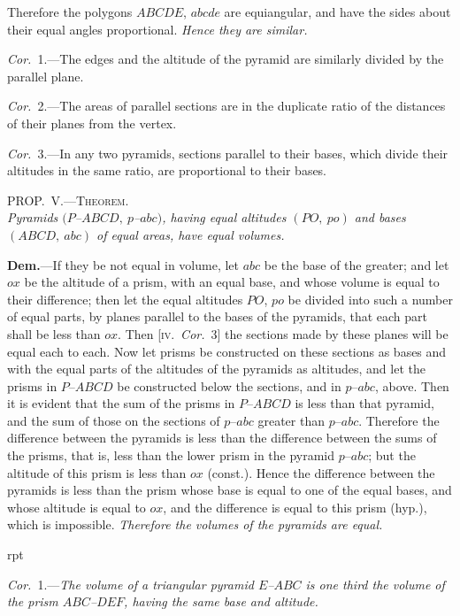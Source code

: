 \documentclass[oneside]{book}
\newcommand\myprop[2]{
\bigskip\Needspace*{4\baselineskip}\begin{center}\textsc{#1}\\\medskip\emph{#2}\par\end{center}
}
\newcommand\imgflow[3]{
\setcounter{wrapwidth}{#1}
\begin{wrapfigure}[#2]{r}{\value{wrapwidth}pt}
\begin{center}
\vspace{-0.3in}
\end{center}
\end{wrapfigure}
}
\newcommand\imgcent[2]{
\begin{center}
\end{center}
}
\begin{document}
Therefore the polygons $ABCDE$, $abcde$ are equiangular,
and have the sides about their equal angles proportional.
\emph{Hence they are similar.}

\emph{Cor.}~1.---The edges and the altitude of the pyramid
are similarly divided by the parallel plane.

\emph{Cor.}~2.---The areas of parallel sections are in the
duplicate ratio of the distances of their planes from the
vertex.

\emph{Cor.}~3.---In any two pyramids, sections parallel to
their bases, which divide their altitudes in the same
ratio, are proportional to their bases.


\myprop{PROP\@.~V.---Theorem.}{Pyramids $(P$--$ABCD,\ p$--$abc)$, having equal altitudes
$(PO,\ po)$ and bases $(ABCD,\ abc)$ of equal areas, have equal
volumes.}

\imgcent{298}{f242}

\textbf{Dem.}---If they be not equal in volume, let $abc$ be
the base of the greater; and let $ox$ be the altitude of a
prism, with an equal base, and whose volume is equal
to their difference; then let the equal altitudes $PO$, $po$
be divided into such a number of equal parts, by planes
parallel to the bases of the pyramids, that each part
shall be less than $ox$. Then [\textsc{iv.}\ \emph{Cor.}~3] the sections
made by these planes will be equal each to each. Now
let prisms be constructed on these sections as bases and
with the equal parts of the altitudes of the pyramids as
altitudes, and let the prisms in $P$--$ABCD$ be constructed
below the sections, and in $p$--$abc$, above. Then it is
evident that the sum of the prisms in $P$--$ABCD$ is
less than that pyramid, and the sum of those on the
sections of $p$--$abc$ greater than $p$--$abc$. Therefore the
difference between the pyramids is less than the difference
between the sums of the prisms, that is, less than
the lower prism in the pyramid $p$--$abc$; but the altitude
of this prism is less than $ox$ (const.). Hence the difference
between the pyramids is less than the prism
whose base is equal to one of the equal bases, and
whose altitude is equal to $ox$, and the difference is
equal to this prism (hyp.), which is impossible. \emph{Therefore
the volumes of the pyramids are equal.}

\imgflow{113}{13}{f243}

\emph{Cor.}~1.---\textit{The volume of a triangular pyramid $E$--$ABC$
is one third the volume of the prism
$ABC$--$DEF$, having the same base
and altitude.}
\end{document}
